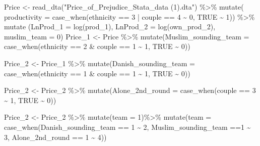 \documentclass[
]{article}
\newenvironment{Shaded}{\begin{snugshade}}{\end{snugshade}}
\newcommand{\AttributeTok}[1]{\textcolor[rgb]{0.77,0.63,0.00}{#1}}
\newcommand{\ConstantTok}[1]{\textcolor[rgb]{0.00,0.00,0.00}{#1}}
\newcommand{\DecValTok}[1]{\textcolor[rgb]{0.00,0.00,0.81}{#1}}
\newcommand{\FunctionTok}[1]{\textcolor[rgb]{0.00,0.00,0.00}{#1}}
\newcommand{\NormalTok}[1]{#1}
\newcommand{\OtherTok}[1]{\textcolor[rgb]{0.56,0.35,0.01}{#1}}
\newcommand{\SpecialCharTok}[1]{\textcolor[rgb]{0.00,0.00,0.00}{#1}}
\newcommand{\StringTok}[1]{\textcolor[rgb]{0.31,0.60,0.02}{#1}}
\begin{document}
\begin{Shaded}
\begin{Highlighting}[]
\NormalTok{Price }\OtherTok{\textless{}{-}} \FunctionTok{read\_dta}\NormalTok{(}\StringTok{"Price\_of\_Prejudice\_Stata\_data (1).dta"}\NormalTok{) }\SpecialCharTok{\%\textgreater{}\%}
  \FunctionTok{mutate}\NormalTok{( }\AttributeTok{productivity =} \FunctionTok{case\_when}\NormalTok{(ethnicity }\SpecialCharTok{==} \DecValTok{3} \SpecialCharTok{|}\NormalTok{ couple }\SpecialCharTok{==} \DecValTok{4} \SpecialCharTok{\textasciitilde{}} \DecValTok{0}\NormalTok{, }\ConstantTok{TRUE} \SpecialCharTok{\textasciitilde{}} \DecValTok{1}\NormalTok{)) }\SpecialCharTok{\%\textgreater{}\%}
  \FunctionTok{mutate}\NormalTok{ (}\AttributeTok{LnProd\_1 =} \FunctionTok{log}\NormalTok{(prod\_1),}
          \AttributeTok{LnProd\_2 =} \FunctionTok{log}\NormalTok{(own\_prod\_2),}
          \AttributeTok{muslim\_team =} \DecValTok{0}\NormalTok{)}
\NormalTok{Price\_1 }\OtherTok{\textless{}{-}}\NormalTok{ Price }\SpecialCharTok{\%\textgreater{}\%}
  \FunctionTok{mutate}\NormalTok{(}\AttributeTok{Muslim\_sounding\_team =} \FunctionTok{case\_when}\NormalTok{(ethnicity }\SpecialCharTok{==} \DecValTok{2} \SpecialCharTok{\&}\NormalTok{ couple }\SpecialCharTok{==} \DecValTok{1} \SpecialCharTok{\textasciitilde{}} \DecValTok{1}\NormalTok{, }
                                          \ConstantTok{TRUE} \SpecialCharTok{\textasciitilde{}} \DecValTok{0}\NormalTok{))}
    
\NormalTok{Price\_2 }\OtherTok{\textless{}{-}}\NormalTok{ Price\_1 }\SpecialCharTok{\%\textgreater{}\%}
  \FunctionTok{mutate}\NormalTok{(}\AttributeTok{Danish\_sounding\_team =} \FunctionTok{case\_when}\NormalTok{(ethnicity }\SpecialCharTok{==} \DecValTok{1} \SpecialCharTok{\&}\NormalTok{ couple }\SpecialCharTok{==} \DecValTok{1} \SpecialCharTok{\textasciitilde{}} \DecValTok{1}\NormalTok{,}
                                          \ConstantTok{TRUE} \SpecialCharTok{\textasciitilde{}} \DecValTok{0}\NormalTok{))}

\NormalTok{Price\_2 }\OtherTok{\textless{}{-}}\NormalTok{ Price\_2 }\SpecialCharTok{\%\textgreater{}\%}
  \FunctionTok{mutate}\NormalTok{(}\AttributeTok{Alone\_2nd\_round =} \FunctionTok{case\_when}\NormalTok{(couple }\SpecialCharTok{==} \DecValTok{3} \SpecialCharTok{\textasciitilde{}} \DecValTok{1}\NormalTok{, }\ConstantTok{TRUE} \SpecialCharTok{\textasciitilde{}} \DecValTok{0}\NormalTok{))}
         
\NormalTok{Price\_2 }\OtherTok{\textless{}{-}}\NormalTok{ Price\_2 }\SpecialCharTok{\%\textgreater{}\%}
  \FunctionTok{mutate}\NormalTok{(}\AttributeTok{team =} \DecValTok{1}\NormalTok{)}\SpecialCharTok{\%\textgreater{}\%}
  \FunctionTok{mutate}\NormalTok{(}\AttributeTok{team =} \FunctionTok{case\_when}\NormalTok{(Danish\_sounding\_team }\SpecialCharTok{==} \DecValTok{1} \SpecialCharTok{\textasciitilde{}} \DecValTok{2}\NormalTok{, Muslim\_sounding\_team }
                          \SpecialCharTok{==}\DecValTok{1} \SpecialCharTok{\textasciitilde{}} \DecValTok{3}\NormalTok{, Alone\_2nd\_round }\SpecialCharTok{==} \DecValTok{1} \SpecialCharTok{\textasciitilde{}} \DecValTok{4}\NormalTok{))}


\end{Highlighting}
\end{Shaded}
\end{document}
